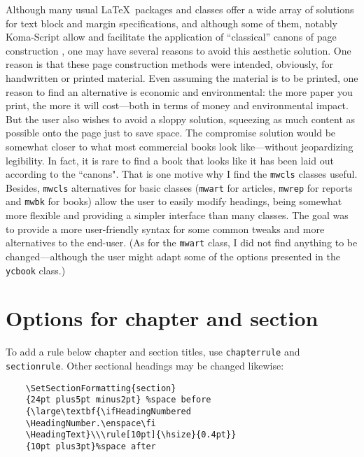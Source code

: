 \documentclass[withmarginpar,titleauthor,11pt]{mwart}
\newcommand{\option}[1]{\marginpar{\footnotesize \texttt{#1}}}
\newcommand{\opt}[1]{\texttt{#1}}
\begin{document}
Although many usual \LaTeX\ packages and classes offer a wide array of solutions for text block and margin specifications, and although some of them, notably Koma-Script \parencite{koma-script} allow and facilitate the application of “classical” canons of page construction \parencite{tschichold_form_1991,bringhurst_elements_2013}, one may have several reasons to avoid this aesthetic solution. One reason is that these page construction methods were intended, obviously, for handwritten or printed material. Even assuming the material is to be printed, one reason to find an alternative is economic and environmental: the more paper you print, the more it will cost---both in terms of money and environmental impact. But the user also wishes to avoid a sloppy solution, squeezing as much content as possible onto the page just to save space. The compromise solution would be somewhat closer to what most commercial books look like---without jeopardizing legibility. In fact, it is rare to find a book that looks like it has been laid out according to the ``canons". That is one motive why I find the \texttt{mwcls} classes \parencite{mwcls} useful. Besides,  \texttt{mwcls} alternatives for basic classes (\texttt{mwart} for articles,  \texttt{mwrep} for reports and \texttt{mwbk} for books) allow the user to easily modify headings, being somewhat more flexible and providing a simpler interface than many classes. The goal was to provide a more user-friendly syntax for some common tweaks and more alternatives to the end-user. (As for the \texttt{mwart} class, I did not find anything to be changed---although the user might adapt some of the options presented in the \texttt{ycbook} class.)



\section{Options for chapter and section}
To add a rule below chapter and section titles, use \opt{chapterrule} and
\opt{sectionrule}. Other sectional headings may be changed likewise:

\option{chapterrule}
\option{sectionrule}


\begin{verbatim}
	\SetSectionFormatting{section}
	{24pt plus5pt minus2pt} %space before
	{\large\textbf{\ifHeadingNumbered
	\HeadingNumber.\enspace\fi
	\HeadingText}\\\rule[10pt]{\hsize}{0.4pt}}
	{10pt plus3pt}%space after
\end{verbatim}
\end{document}
